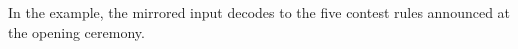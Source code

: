 In the example, the mirrored input decodes to the five contest rules announced at the opening ceremony.
